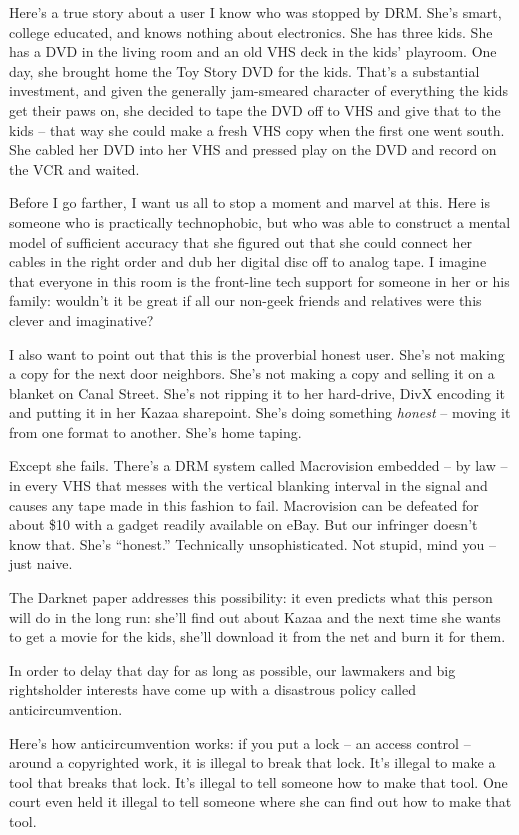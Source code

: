 Here's a true story about a user I know who was stopped by DRM.
She's smart, college educated, and knows nothing about electronics.
She has three kids. She has a DVD in the living room and an old VHS
deck in the kids' playroom. One day, she brought home the Toy Story
DVD for the kids. That's a substantial investment, and given the
generally jam-smeared character of everything the kids get their
paws on, she decided to tape the DVD off to VHS and give that to
the kids -- that way she could make a fresh VHS copy when the first
one went south. She cabled her DVD into her VHS and pressed play on
the DVD and record on the VCR and waited.

Before I go farther, I want us all to stop a moment and marvel at
this. Here is someone who is practically technophobic, but who was
able to construct a mental model of sufficient accuracy that she
figured out that she could connect her cables in the right order
and dub her digital disc off to analog tape. I imagine that
everyone in this room is the front-line tech support for someone in
her or his family: wouldn't it be great if all our non-geek friends
and relatives were this clever and imaginative?

I also want to point out that this is the proverbial honest user.
She's not making a copy for the next door neighbors. She's not
making a copy and selling it on a blanket on Canal Street. She's
not ripping it to her hard-drive, DivX encoding it and putting it
in her Kazaa sharepoint. She's doing something \emph{honest} --
moving it from one format to another. She's home taping.

Except she fails. There's a DRM system called Macrovision embedded
-- by law -- in every VHS that messes with the vertical blanking
interval in the signal and causes any tape made in this fashion to
fail. Macrovision can be defeated for about \$10 with a gadget
readily available on eBay. But our infringer doesn't know that.
She's ``honest.'' Technically unsophisticated. Not stupid, mind you
-- just naive.

The Darknet paper addresses this possibility: it even predicts what
this person will do in the long run: she'll find out about Kazaa
and the next time she wants to get a movie for the kids, she'll
download it from the net and burn it for them.

In order to delay that day for as long as possible, our lawmakers
and big rightsholder interests have come up with a disastrous
policy called anticircumvention.

Here's how anticircumvention works: if you put a lock -- an access
control -- around a copyrighted work, it is illegal to break that
lock. It's illegal to make a tool that breaks that lock. It's
illegal to tell someone how to make that tool. One court even held
it illegal to tell someone where she can find out how to make that
tool.

